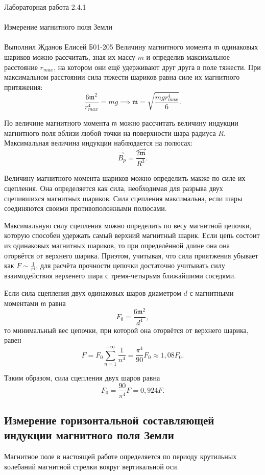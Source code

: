 \documentclass{astroedu-lab}
\begin{document}
\begin{problem}{\huge Лабораторная работа 2.4.1\\\\Измерение магнитного поля Земли\\\\Выполнил Жданов Елисей Б01-205}
Величину магнитного момента $\mathfrak{m}$ одинаковых шариков можно рассчитать, зная их массу $m$ и определив максимальное расстояние $r_{max}$, на котором они ещё удерживают друг друга в поле тяжести. При максимальном расстоянии сила тяжести шариков равна силе их магнитного притяжения:\[\frac{6\mathfrak{m}^2}{r_{max}^4}=mg\implies\mathfrak{m}=\sqrt{\frac{mgr_{max}^4}{6}}.\]

По величине магнитного момента $\mathfrak{m}$ можно рассчитать величину индукции магнитного поля вблизи любой точки на поверхности шара радиуса $R$. Максимальная величина индукции наблюдается на полюсах:\[\vec{B}_p=\frac{2\vec{\mathfrak{m}}}{R^3}.\]

Величину магнитного момента шариков можно определить макже по силе их сцепления. Она определяется как сила, необходимая для разрыва двух сцепившихся магнитных шариков. Сила сцепления максимальна, если шары соединяются своими противоположными полюсами.

Максимальную силу сцепления можно определить по весу магнитной цепочки, которую способен удержать самый верхний магнитный шарик. Если цепь состоит из одинаковых магнитных шариков, то при определённой длине она она оторвётся от верхнего шарика. Приэтом, учитывая, что сила приятжения убывает как $F\sim\frac{1}{r^4}$, для расчёта прочности цепочки достаточно учитывать силу взаимодействия верхенего шара с тремя-четырьмя ближайшими соседями.

Если сила сцепления двух одинаковых шаров диаметром $d$ с магнитными моментами $\mathfrak{m}$ равна\[F_0=\frac{6\mathfrak{m}^2}{d^4},\]то минимальный вес цепочки, при которой она оторвётся от верхнего шарика, равен\[F=F_0\sum_{n=1}^{+\infty}\frac{1}{n^4}=\frac{\pi^4}{90}F_0\approx1,08F_0.\]

Таким образом, сила сцепления двух шаров равна\[F_0=\frac{90}{\pi^4}F=0,924F.\]

\subsection{Измерение горизонтальной составляющей индукции магнитного поля Земли}

Магнитное поле в настоящей работе определяется по периоду крутильных колебаний магнитной стрелки вокруг вертикальной оси.


\end{problem}
\end{document}
